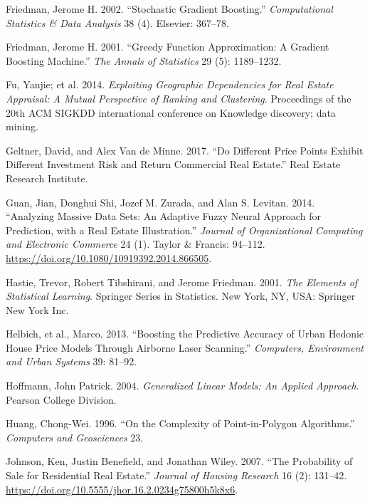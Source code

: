 \documentclass[12pt,]{article}
\begin{document}
\leavevmode\hypertarget{ref-friedman2002stochastic}{}%
Friedman, Jerome H. 2002. ``Stochastic Gradient Boosting.''
\emph{Computational Statistics \& Data Analysis} 38 (4). Elsevier:
367--78.

\leavevmode\hypertarget{ref-Friedman2001}{}%
Friedman, Jerome H. 2001. ``Greedy Function Approximation: A Gradient
Boosting Machine.'' \emph{The Annals of Statistics} 29 (5): 1189--1232.

\leavevmode\hypertarget{ref-Fu2014}{}%
Fu, Yanjie; et al. 2014. \emph{Exploiting Geographic Dependencies for
Real Estate Appraisal: A Mutual Perspective of Ranking and Clustering}.
Proceedings of the 20th ACM SIGKDD international conference on Knowledge
discovery; data mining.

\leavevmode\hypertarget{ref-Geltner2017}{}%
Geltner, David, and Alex Van de Minne. 2017. ``Do Different Price Points
Exhibit Different Investment Risk and Return Commercial Real Estate.''
Real Estate Research Institute.

\leavevmode\hypertarget{ref-Guan2014}{}%
Guan, Jian, Donghui Shi, Jozef M. Zurada, and Alan S. Levitan. 2014.
``Analyzing Massive Data Sets: An Adaptive Fuzzy Neural Approach for
Prediction, with a Real Estate Illustration.'' \emph{Journal of
Organizational Computing and Electronic Commerce} 24 (1). Taylor \&
Francis: 94--112. \url{https://doi.org/10.1080/10919392.2014.866505}.

\leavevmode\hypertarget{ref-hastie01statisticallearning}{}%
Hastie, Trevor, Robert Tibshirani, and Jerome Friedman. 2001. \emph{The
Elements of Statistical Learning}. Springer Series in Statistics. New
York, NY, USA: Springer New York Inc.

\leavevmode\hypertarget{ref-Helbich2013}{}%
Helbich, et al., Marco. 2013. ``Boosting the Predictive Accuracy of
Urban Hedonic House Price Models Through Airborne Laser Scanning.''
\emph{Computers, Environment and Urban Systems} 39: 81--92.

\leavevmode\hypertarget{ref-hoffmann2004generalized}{}%
Hoffmann, John Patrick. 2004. \emph{Generalized Linear Models: An
Applied Approach}. Pearson College Division.

\leavevmode\hypertarget{ref-Huang1996}{}%
Huang, Chong-Wei. 1996. ``On the Complexity of Point-in-Polygon
Algorithms.'' \emph{Computers and Geosciences} 23.

\leavevmode\hypertarget{ref-Johnson2007}{}%
Johnson, Ken, Justin Benefield, and Jonathan Wiley. 2007. ``The
Probability of Sale for Residential Real Estate.'' \emph{Journal of
Housing Research} 16 (2): 131--42.
\url{https://doi.org/10.5555/jhor.16.2.0234g75800h5k8x6}.
\end{document}
